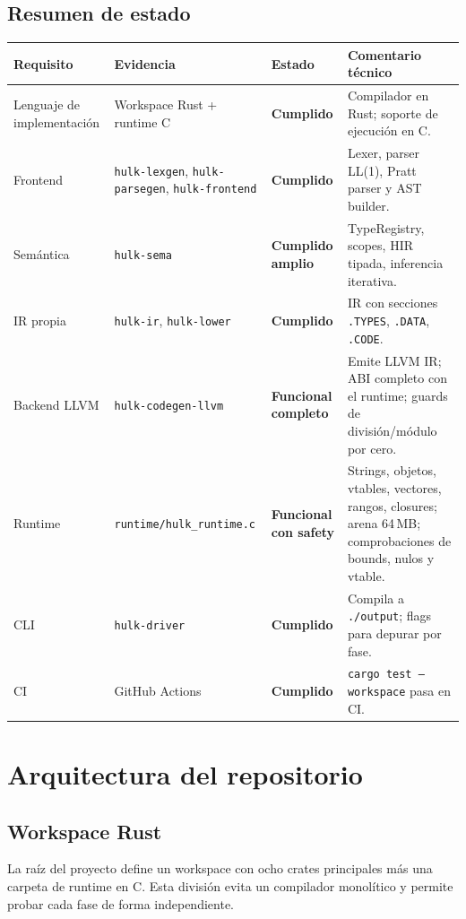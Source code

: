 \documentclass[12pt,letterpaper]{article}
\newcommand{\estado}[1]{\textbf{#1}}
\newcommand{\src}[1]{\texttt{#1}}
\begin{document}
\subsection{Resumen de estado}

{\small\begin{longtable}{p{3.0cm}p{4.5cm}p{2.8cm}p{4.0cm}}
\toprule
\textbf{Requisito} & \textbf{Evidencia} & \textbf{Estado} & \textbf{Comentario técnico} \\
\midrule
Lenguaje de implementación & Workspace Rust + runtime C & \estado{Cumplido} & Compilador en Rust; soporte de ejecución en C. \\
Frontend & \src{hulk-lexgen}, \src{hulk-parsegen}, \src{hulk-frontend} & \estado{Cumplido} & Lexer, parser LL(1), Pratt parser y AST builder. \\
Semántica & \src{hulk-sema} & \estado{Cumplido amplio} & TypeRegistry, scopes, HIR tipada, inferencia iterativa. \\
IR propia & \src{hulk-ir}, \src{hulk-lower} & \estado{Cumplido} & IR con secciones \src{.TYPES}, \src{.DATA}, \src{.CODE}. \\
Backend LLVM & \src{hulk-codegen-llvm} & \estado{Funcional completo} & Emite LLVM IR; ABI completo con el runtime; guards de división/módulo por cero. \\
Runtime & \src{runtime/hulk\_runtime.c} & \estado{Funcional con safety} & Strings, objetos, vtables, vectores, rangos, closures; arena 64\,MB; comprobaciones de bounds, nulos y vtable. \\
CLI & \src{hulk-driver} & \estado{Cumplido} & Compila a \src{./output}; flags para depurar por fase. \\
CI & GitHub Actions & \estado{Cumplido} & \src{cargo test --workspace} pasa en CI. \\
\bottomrule
\end{longtable}}

\section{Arquitectura del repositorio}

\subsection{Workspace Rust}

La raíz del proyecto define un workspace con ocho crates principales más una carpeta de runtime en C. Esta división evita un compilador monolítico y permite probar cada fase de forma independiente.
\end{document}
